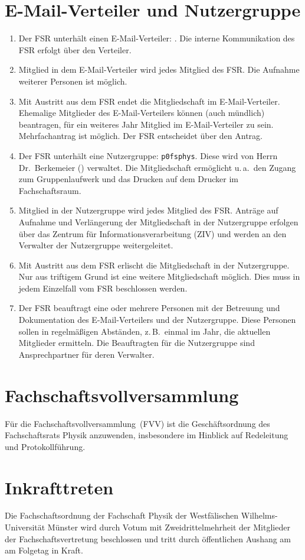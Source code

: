 \section{E-Mail-Verteiler und Nutzergruppe}
\begin{enumerate}
	\item Der FSR unterhält einen E-Mail-Verteiler: .
	Die interne Kommunikation des FSR erfolgt über den Verteiler.
	\item Mitglied in dem E-Mail-Verteiler wird jedes Mitglied des FSR.
	Die Aufnahme weiterer Personen ist möglich.
	\item Mit Austritt aus dem FSR endet die Mitgliedschaft im E-Mail-Verteiler.
	Ehemalige Mitglieder des E-Mail-Verteilers können (auch mündlich) beantragen, für ein weiteres Jahr Mitglied im E-Mail-Verteiler zu sein.
	Mehrfachantrag ist möglich.
	Der FSR entscheidet über den Antrag.
	\item Der FSR unterhält eine Nutzergruppe: \texttt{p0fsphys}.
	Diese wird von Herrn Dr.~Berkemeier () verwaltet.
	Die Mitgliedschaft ermöglicht u.\,a.\ den Zugang zum Gruppenlaufwerk und das Drucken auf dem Drucker im Fachschaftsraum.
	\item Mitglied in der Nutzergruppe wird jedes Mitglied des FSR.
	Anträge auf Aufnahme und Verlängerung der Mitgliedschaft in der Nutzergruppe erfolgen über das Zentrum für Informationsverarbeitung (ZIV) und werden an den Verwalter der Nutzergruppe weitergeleitet.
	\item Mit Austritt aus dem FSR erlischt die Mitgliedschaft in der Nutzergruppe.
	Nur aus triftigem Grund ist eine weitere Mitgliedschaft möglich.
	Dies muss in jedem Einzelfall vom FSR beschlossen werden.
	\item Der FSR beauftragt eine oder mehrere Personen mit der Betreuung und Dokumentation des E-Mail-Verteilers und der Nutzergruppe.
	Diese Personen sollen in regelmäßigen Abständen, z.\,B.\ einmal im Jahr, die aktuellen Mitglieder ermitteln.
	Die Beauftragten für die Nutzergruppe sind Ansprechpartner für deren Verwalter.
\end{enumerate}

\section{Fachschaftsvollversammlung}
Für die Fachschaftsvollversammlung~(FVV) ist die Geschäftsordnung des Fachschaftsrats Physik anzuwenden, insbesondere im Hinblick auf Redeleitung und Protokollführung.

\section{Inkrafttreten}
Die Fachschaftsordnung der Fachschaft Physik der Westfälischen Wilhelms-Universität Münster wird durch Votum mit Zweidrittelmehrheit der Mitglieder der Fachschaftsvertretung beschlossen und tritt durch öffentlichen Aushang am  am Folgetag in Kraft.


